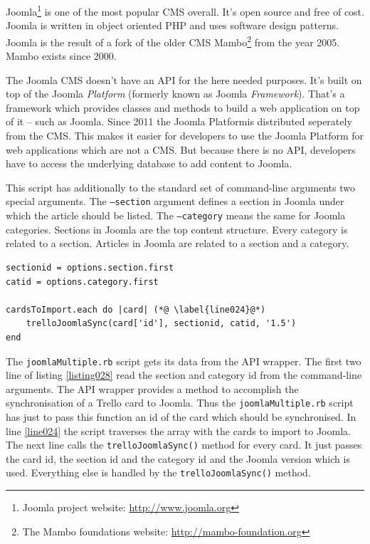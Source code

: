 Joomla\footnote{Joomla project website: \url{http://www.joomla.org}} is one of the most popular CMS  overall. It's open source and free of cost. Joomla is written in object oriented PHP \cite{joomla:architecture} and uses software design patterns. \cite{joomla:mvc} Joomla is the result of a fork of the older CMS Mambo\footnote{The Mambo foundations website: \url{http://mambo-foundation.org}} from the year 2005. Mambo exists since 2000.

The Joomla CMS doesn't have an API for the here needed purposes. It's built on top of the Joomla \emph{Platform} (formerly known as Joomla \emph{Framework}). That's a framework which provides classes and methods to build a web application on top of it – such as Joomla. Since 2011 the Joomla Platformis distributed seperately from the CMS. This makes it easier for developers to use the Joomla Platform for web applications which are not a CMS. \cite{joomla:api} But because there is no API, developers have to access the underlying database to add content to Joomla.

This script has additionally to the standard set of command-line arguments two special arguments. The \texttt{--section} argument defines a section in Joomla under which the article should be listed. The \texttt{--category} means the same for Joomla categories. Sections in Joomla are the top content structure. Every category is related to a section. Articles in Joomla are related to a section and a category.

\begin{lstlisting}[aboveskip=1\baselineskip, caption=Passing the needed information to the trelloJoomlaSync() method., label=listing028]
sectionid = options.section.first
catid = options.category.first

cardsToImport.each do |card| (*@ \label{line024}@*)
	trelloJoomlaSync(card['id'], sectionid, catid, '1.5')
end
\end{lstlisting}

The \texttt{joomlaMultiple.rb} script gets its data from the API wrapper. The first two line of listing \ref{listing028} read the section and category id from the command-line arguments. The API wrapper provides a method to accomplish the synchronisation of a Trello card to Joomla. Thus the \texttt{joomlaMultiple.rb} script has just to pass this function an id of the card which should be synchronised. In line \ref{line024} the script traverses the array with the cards to import to Joomla. The next line calls the \lstinline{trelloJoomlaSync()} method for every card. It just passes the card id, the section id and the category id and the Joomla version which is used. Everything else is handled by the \lstinline{trelloJoomlaSync()} method.


